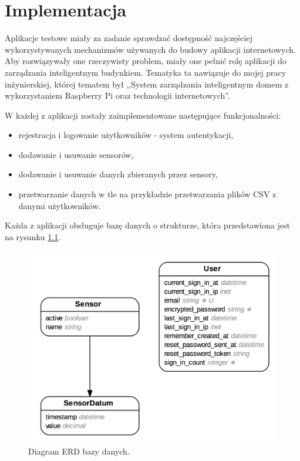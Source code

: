 \chapter{Implementacja}
Aplikacje testowe miały za zadanie sprawdzać dostępność najczęściej wykorzystywanych mechanizmów używanych do budowy aplikacji internetowych. Aby rozwiązywały one rzeczywisty problem, miały one pełnić rolę aplikacji do zarządzania inteligentnym budynkiem. Tematyka ta nawiązuje do mojej pracy inżynierskiej, której tematem był ,,System zarządzania inteligentnym domem z wykorzystaniem Raspberry Pi oraz technologii internetowych''.

W każdej z aplikacji zostały zaimplementowane następujące funkcjonalności:
\begin{itemize}
  \item rejestracja i logowanie użytkowników - system autentykacji,
  \item dodawanie i usuwanie sensorów,
  \item dodawanie i usuwanie danych zbieranych przez sensory,
  \item przetwarzanie danych w tle na przykładzie przetwarzania plików CSV z danymi użytkowników.
\end{itemize}

Każda z aplikacji obsługuje bazę danych o strukturze, która przedstawiona jest na rysunku \ref{fig:diagram_erd}.

\begin{figure}[h]
  \centering
  \includegraphics[width=\linewidth]{images/diagram_erd}
  \caption{Diagram ERD bazy danych.}
  \label{fig:diagram_erd}
\end{figure}
\newpage
